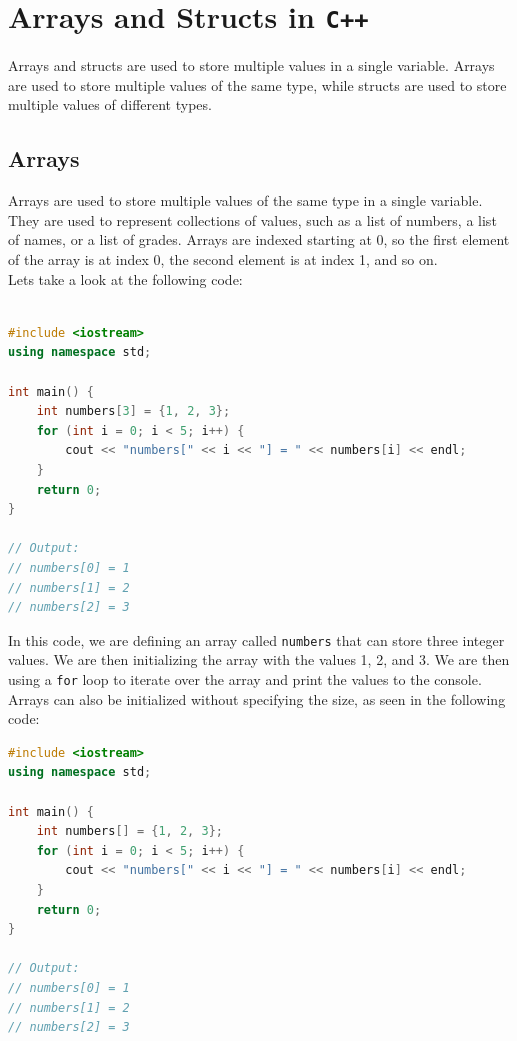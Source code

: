 \section{Arrays and Structs in \texttt{C++}}

Arrays and structs are used to store multiple values in a single variable. Arrays are used to store multiple values of the
same type, while structs are used to store multiple values of different types.\\

\subsection{Arrays}

Arrays are used to store multiple values of the same type in a single variable. They are used to represent collections of
values, such as a list of numbers, a list of names, or a list of grades. Arrays are indexed starting at 0, so the first
element of the array is at index 0, the second element is at index 1, and so on.\\

Lets take a look at the following code:

\begin{lstlisting}[language=C++]

#include <iostream>
using namespace std;

int main() {
    int numbers[3] = {1, 2, 3};
    for (int i = 0; i < 5; i++) {
        cout << "numbers[" << i << "] = " << numbers[i] << endl;
    }
    return 0;
}

// Output:
// numbers[0] = 1
// numbers[1] = 2
// numbers[2] = 3
\end{lstlisting}

In this code, we are defining an array called \texttt{numbers} that can store three integer values. We are then initializing
the array with the values 1, 2, and 3. We are then using a \texttt{for} loop to iterate over the array and print the values
to the console.\\

Arrays can also be initialized without specifying the size, as seen in the following code:

\begin{lstlisting}[language=C++]
#include <iostream>
using namespace std;

int main() {
    int numbers[] = {1, 2, 3};
    for (int i = 0; i < 5; i++) {
        cout << "numbers[" << i << "] = " << numbers[i] << endl;
    }
    return 0;
}

// Output:
// numbers[0] = 1
// numbers[1] = 2
// numbers[2] = 3
\end{lstlisting}

